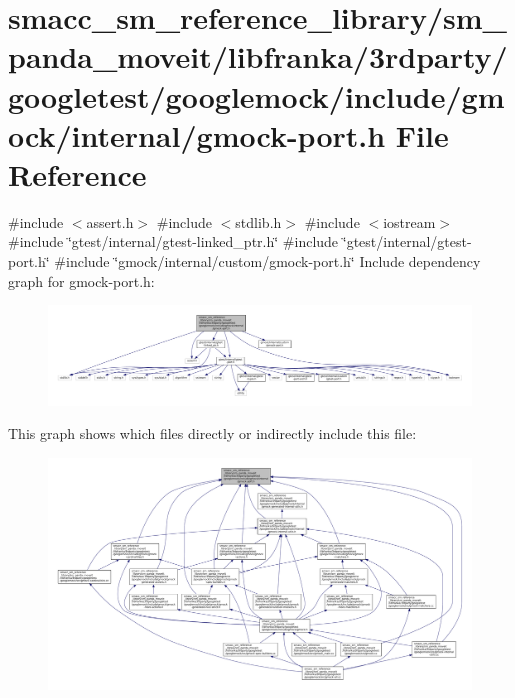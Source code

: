 \hypertarget{gmock-port_8h}{}\section{smacc\+\_\+sm\+\_\+reference\+\_\+library/sm\+\_\+panda\+\_\+moveit/libfranka/3rdparty/googletest/googlemock/include/gmock/internal/gmock-\/port.h File Reference}
\label{gmock-port_8h}
{\ttfamily \#include $<$assert.\+h$>$}\newline
{\ttfamily \#include $<$stdlib.\+h$>$}\newline
{\ttfamily \#include $<$iostream$>$}\newline
{\ttfamily \#include \char`\"{}gtest/internal/gtest-\/linked\+\_\+ptr.\+h\char`\"{}}\newline
{\ttfamily \#include \char`\"{}gtest/internal/gtest-\/port.\+h\char`\"{}}\newline
{\ttfamily \#include \char`\"{}gmock/internal/custom/gmock-\/port.\+h\char`\"{}}\newline
Include dependency graph for gmock-\/port.h\+:
\nopagebreak
\begin{figure}[H]
\begin{center}
\leavevmode
\includegraphics[width=350pt]{gmock-port_8h__incl}
\end{center}
\end{figure}
This graph shows which files directly or indirectly include this file\+:
\nopagebreak
\begin{figure}[H]
\begin{center}
\leavevmode
\includegraphics[width=350pt]{gmock-port_8h__dep__incl}
\end{center}
\end{figure}
